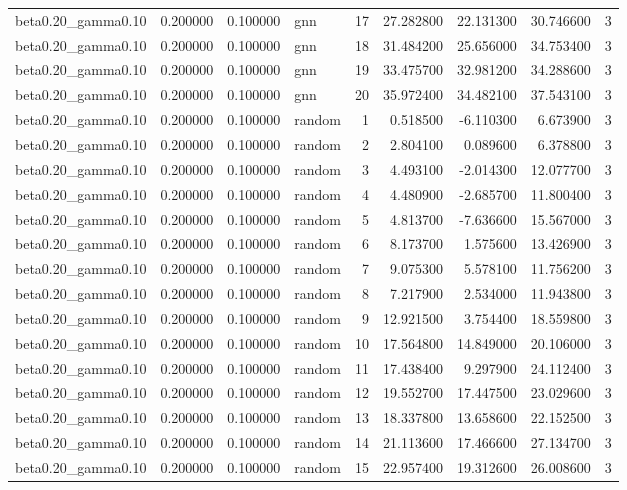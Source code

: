 \begin{tabular}{lrrlrrrrr}
beta0.20\_gamma0.10 & 0.200000 & 0.100000 & gnn & 17 & 27.282800 & 22.131300 & 30.746600 & 3 \\
beta0.20\_gamma0.10 & 0.200000 & 0.100000 & gnn & 18 & 31.484200 & 25.656000 & 34.753400 & 3 \\
beta0.20\_gamma0.10 & 0.200000 & 0.100000 & gnn & 19 & 33.475700 & 32.981200 & 34.288600 & 3 \\
beta0.20\_gamma0.10 & 0.200000 & 0.100000 & gnn & 20 & 35.972400 & 34.482100 & 37.543100 & 3 \\
beta0.20\_gamma0.10 & 0.200000 & 0.100000 & random & 1 & 0.518500 & -6.110300 & 6.673900 & 3 \\
beta0.20\_gamma0.10 & 0.200000 & 0.100000 & random & 2 & 2.804100 & 0.089600 & 6.378800 & 3 \\
beta0.20\_gamma0.10 & 0.200000 & 0.100000 & random & 3 & 4.493100 & -2.014300 & 12.077700 & 3 \\
beta0.20\_gamma0.10 & 0.200000 & 0.100000 & random & 4 & 4.480900 & -2.685700 & 11.800400 & 3 \\
beta0.20\_gamma0.10 & 0.200000 & 0.100000 & random & 5 & 4.813700 & -7.636600 & 15.567000 & 3 \\
beta0.20\_gamma0.10 & 0.200000 & 0.100000 & random & 6 & 8.173700 & 1.575600 & 13.426900 & 3 \\
beta0.20\_gamma0.10 & 0.200000 & 0.100000 & random & 7 & 9.075300 & 5.578100 & 11.756200 & 3 \\
beta0.20\_gamma0.10 & 0.200000 & 0.100000 & random & 8 & 7.217900 & 2.534000 & 11.943800 & 3 \\
beta0.20\_gamma0.10 & 0.200000 & 0.100000 & random & 9 & 12.921500 & 3.754400 & 18.559800 & 3 \\
beta0.20\_gamma0.10 & 0.200000 & 0.100000 & random & 10 & 17.564800 & 14.849000 & 20.106000 & 3 \\
beta0.20\_gamma0.10 & 0.200000 & 0.100000 & random & 11 & 17.438400 & 9.297900 & 24.112400 & 3 \\
beta0.20\_gamma0.10 & 0.200000 & 0.100000 & random & 12 & 19.552700 & 17.447500 & 23.029600 & 3 \\
beta0.20\_gamma0.10 & 0.200000 & 0.100000 & random & 13 & 18.337800 & 13.658600 & 22.152500 & 3 \\
beta0.20\_gamma0.10 & 0.200000 & 0.100000 & random & 14 & 21.113600 & 17.466600 & 27.134700 & 3 \\
beta0.20\_gamma0.10 & 0.200000 & 0.100000 & random & 15 & 22.957400 & 19.312600 & 26.008600 & 3 \\

\end{tabular}

